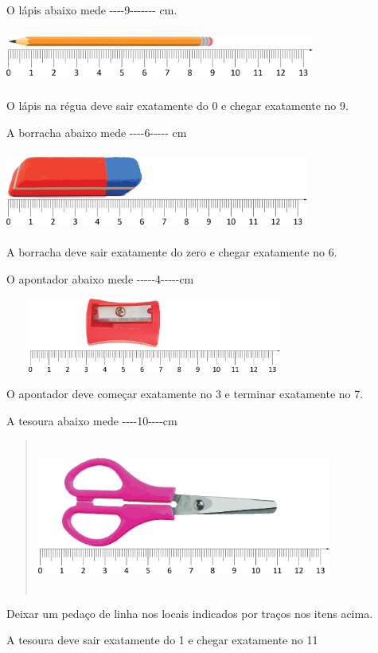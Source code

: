 \begin{escolha}

\item
  O lápis abaixo mede -\/-\/-\/-9-\/-\/-\/-\/-\/-\/- cm.

  \includegraphics[width=4.00868in,height=0.70839in]{media/image42.png}

  O lápis na régua deve sair exatamente do 0 e chegar exatamente no 9.


\item
  A borracha abaixo mede -\/-\/-\/-6-\/-\/-\/-\/- cm

  \includegraphics[width=3.93367in,height=1.02509in]{media/image43.png}

  A borracha deve sair exatamente do zero e chegar exatamente no 6.

\item
  O apontador abaixo mede -\/-\/-\/-\/-4-\/-\/-\/-\/-cm

  \includegraphics[width=3.87534in,height=0.95842in]{media/image44.png}

  O apontador deve começar exatamente no 3 e terminar exatamente no 7.

\item
  A tesoura abaixo mede -\/-\/-\/-10-\/-\/-\/-cm

  \begin{quote}
  \includegraphics[width=3.81700in,height=1.97517in]{media/image45.png}
\end{quote}

  Deixar um pedaço de linha nos locais indicados por traços nos itens
acima.

  A tesoura deve sair exatamente do 1 e chegar exatamente no 11
\end{escolha}

